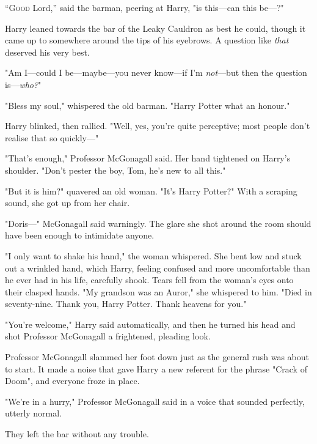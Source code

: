 
\lettrine{“G}{ood} Lord,'' said the barman, peering at Harry, "is this---can this be---?"

Harry leaned towards the bar of the Leaky Cauldron as best he could, though it
came up to somewhere around the tips of his eyebrows. A question like
\emph{that} deserved his very best.

"Am I---could I be---maybe---you never know---if I'm \emph{not}---but then the
question is---\emph{who?}"

"Bless my soul," whispered the old barman. "Harry Potter{\el} what an
honour."

Harry blinked, then rallied. "Well, yes, you're quite perceptive; most people
don't realise that so quickly---"

"That's enough," Professor McGonagall said. Her hand tightened on Harry's
shoulder. "Don't pester the boy, Tom, he's new to all this."

"But it is him?" quavered an old woman. "It's Harry Potter?" With a scraping
sound, she got up from her chair.

"Doris---" McGonagall said warningly. The glare she shot around the room should
have been enough to intimidate anyone.

"I only want to shake his hand," the woman whispered. She bent low and stuck
out a wrinkled hand, which Harry, feeling confused and more uncomfortable than
he ever had in his life, carefully shook. Tears fell from the woman's eyes onto
their clasped hands. "My grandson was an Auror," she whispered to him. "Died in
seventy-nine. Thank you, Harry Potter. Thank heavens for you."

"You're welcome," Harry said automatically, and then he turned his head and
shot Professor McGonagall a frightened, pleading look.

Professor McGonagall slammed her foot down just as the general rush was about
to start. It made a noise that gave Harry a new referent for the phrase "Crack
of Doom", and everyone froze in place.

"We're in a hurry," Professor McGonagall said in a voice that sounded
perfectly, utterly normal.

They left the bar without any trouble.

